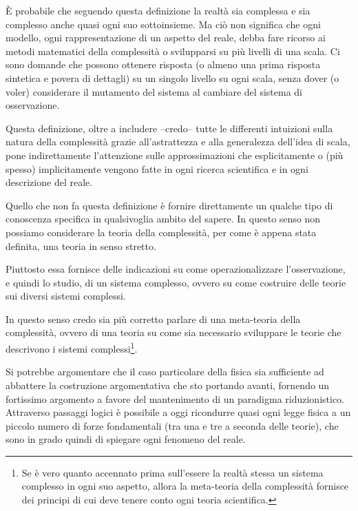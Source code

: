 \documentclass[a4paper, headings=standardclasses]{scrartcl}
\begin{document}
È probabile che seguendo questa definizione la realtà sia complessa e sia complesso anche quasi ogni suo sottoinsieme. Ma ciò non significa che ogni modello, ogni rappresentazione di un aspetto del reale, debba fare ricorso ai metodi matematici della complessità o svilupparsi su più livelli di una scala.
Ci sono domande che possono ottenere risposta (o almeno una prima risposta sintetica e povera di dettagli) su un singolo livello su ogni scala, senza dover (o voler) considerare il mutamento del sistema al cambiare del sistema di osservazione.

Questa definizione, oltre a includere --credo-- tutte le differenti intuizioni sulla natura della complessità grazie all'astrattezza e alla generalezza dell'idea di scala, pone indirettamente l'attenzione sulle approssimazioni che esplicitamente o (più spesso) implicitamente vengono fatte in ogni ricerca scientifica e in ogni descrizione del reale.

Quello che non fa questa definizione è fornire direttamente un qualche tipo di conoscenza specifica in qualsivoglia ambito del sapere.
In questo senso non possiamo considerare la teoria della complessità, per come è appena stata definita, una teoria in senso stretto.

Piuttosto essa fornisce delle indicazioni su come operazionalizzare l'osservazione, e quindi lo studio, di un sistema complesso, ovvero su come costruire delle teorie sui diversi sistemi complessi.

In questo senso credo sia più corretto parlare di una meta-teoria della complessità, ovvero di una teoria su come sia necessario sviluppare le teorie che descrivono i sistemi complessi\footnote{Se è vero quanto accennato prima sull'essere la realtà stessa un sistema complesso in ogni suo aspetto, allora la meta-teoria della complessità fornisce dei principi di cui deve tenere conto ogni teoria scientifica.}.

Si potrebbe argomentare che il caso particolare della fisica sia sufficiente ad abbattere la costruzione argomentativa che sto portando avanti, fornendo un fortissimo argomento a favore del mantenimento di un paradigma riduzionistico.
Attraverso passaggi logici è possibile a oggi ricondurre quasi ogni legge fisica a un piccolo numero di forze fondamentali (tra una e tre a seconda delle teorie), che sono in grado quindi di spiegare ogni fenomeno del reale.
\end{document}
